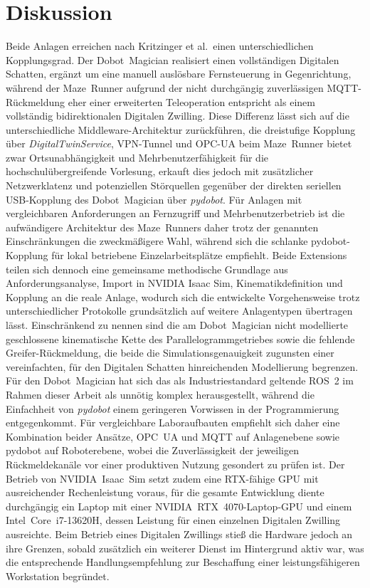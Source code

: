 \documentclass[conference]{IEEEtran}
\begin{document}
\section{Diskussion}
Beide Anlagen erreichen nach Kritzinger et al.\ einen unterschiedlichen Kopplungsgrad.
Der Dobot~Magician realisiert einen vollständigen Digitalen Schatten, ergänzt um eine manuell auslösbare Fernsteuerung in Gegenrichtung, während der Maze~Runner aufgrund der nicht durchgängig zuverlässigen MQTT-Rückmeldung eher einer erweiterten Teleoperation entspricht als einem vollständig bidirektionalen Digitalen Zwilling.
Diese Differenz lässt sich auf die unterschiedliche Middleware-Architektur zurückführen, die dreistufige Kopplung über \emph{DigitalTwinService}, VPN-Tunnel und OPC-UA beim Maze~Runner bietet zwar Ortsunabhängigkeit und Mehrbenutzerfähigkeit für die hochschulübergreifende Vorlesung, erkauft dies jedoch mit zusätzlicher Netzwerklatenz und potenziellen Störquellen gegenüber der direkten seriellen USB-Kopplung des Dobot~Magician über \emph{pydobot}.
Für Anlagen mit vergleichbaren Anforderungen an Fernzugriff und Mehrbenutzerbetrieb ist die aufwändigere Architektur des Maze~Runners daher trotz der genannten Einschränkungen die zweckmäßigere Wahl, während sich die schlanke pydobot-Kopplung für lokal betriebene Einzelarbeitsplätze empfiehlt.
Beide Extensions teilen sich dennoch eine gemeinsame methodische Grundlage aus Anforderungsanalyse, Import in NVIDIA Isaac Sim, Kinematikdefinition und Kopplung an die reale Anlage, wodurch sich die entwickelte Vorgehensweise trotz unterschiedlicher Protokolle grundsätzlich auf weitere Anlagentypen übertragen lässt.
Einschränkend zu nennen sind die am Dobot~Magician nicht modellierte geschlossene kinematische Kette des Parallelogrammgetriebes sowie die fehlende Greifer-Rückmeldung, die beide die Simulationsgenauigkeit zugunsten einer vereinfachten, für den Digitalen Schatten hinreichenden Modellierung begrenzen.
Für den Dobot~Magician hat sich das als Industriestandard geltende ROS~2 im Rahmen dieser Arbeit als unnötig komplex herausgestellt, während die Einfachheit von \emph{pydobot} einem geringeren Vorwissen in der Programmierung entgegenkommt.
Für vergleichbare Laboraufbauten empfiehlt sich daher eine Kombination beider Ansätze, OPC~UA und MQTT auf Anlagenebene sowie pydobot auf Roboterebene, wobei die Zuverlässigkeit der jeweiligen Rückmeldekanäle vor einer produktiven Nutzung gesondert zu prüfen ist.
Der Betrieb von NVIDIA~Isaac~Sim setzt zudem eine RTX-fähige GPU mit ausreichender Rechenleistung voraus, für die gesamte Entwicklung diente durchgängig ein Laptop mit einer NVIDIA~RTX~4070-Laptop-GPU und einem Intel~Core~i7-13620H, dessen Leistung für einen einzelnen Digitalen Zwilling ausreichte.
Beim Betrieb eines Digitalen Zwillings stieß die Hardware jedoch an ihre Grenzen, sobald zusätzlich ein weiterer Dienst im Hintergrund aktiv war, was die entsprechende Handlungsempfehlung zur Beschaffung einer leistungsfähigeren Workstation begründet.
\end{document}
